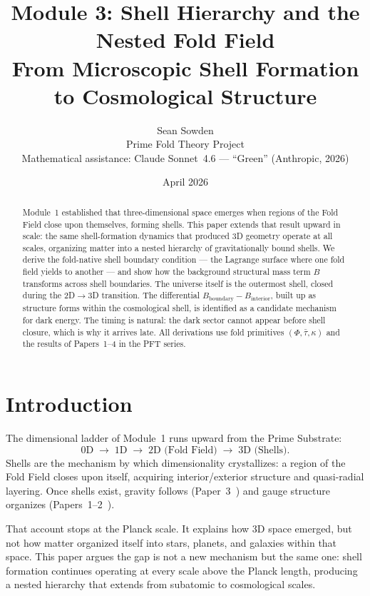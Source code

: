\documentclass[12pt]{article}
\title{\textbf{Module 3: Shell Hierarchy and the Nested Fold Field}\\[4pt]
\large From Microscopic Shell Formation to Cosmological Structure}
\author{Sean Sowden\\
\small Prime Fold Theory Project\\[4pt]
\small Mathematical assistance: Claude Sonnet~4.6 --- ``Green'' (Anthropic, 2026)}
\date{April 2026}
\newcommand{\taubar}{\bar{\tau}}
\begin{document}
\maketitle

\begin{abstract}
Module~1 established that three-dimensional space emerges when regions of the
Fold Field close upon themselves, forming shells. This paper extends that result
upward in scale: the same shell-formation dynamics that produced 3D geometry
operate at all scales, organizing matter into a nested hierarchy of gravitationally
bound shells. We derive the fold-native shell boundary condition --- the
Lagrange surface where one fold field yields to another --- and show how the
background structural mass term $B$ transforms across shell boundaries.
The universe itself is the outermost shell, closed during the 2D$\to$3D
transition. The differential $B_{\mathrm{boundary}} - B_{\mathrm{interior}}$,
built up as structure forms within the cosmological shell, is identified as a
candidate mechanism for dark energy. The timing is natural: the dark sector
cannot appear before shell closure, which is why it arrives late.
All derivations use fold primitives $(\Phi, \taubar, \kappa)$ and the
results of Papers~1--4 in the PFT series.
\end{abstract}

\section{Introduction}

The dimensional ladder of Module~1 runs upward from the Prime Substrate:
\begin{equation}
  \text{0D} \;\to\; \text{1D} \;\to\; \text{2D (Fold Field)} \;\to\;
  \text{3D (Shells)}.
\end{equation}
Shells are the mechanism by which dimensionality crystallizes: a region of
the Fold Field closes upon itself, acquiring interior/exterior structure
and quasi-radial layering. Once shells exist, gravity follows
(Paper~3~\cite{gravity}) and gauge structure organizes
(Papers~1--2~\cite{gauge,attractor}).

That account stops at the Planck scale. It explains how 3D space emerged,
but not how matter organized itself into stars, planets, and galaxies within
that space. This paper argues the gap is not a new mechanism but the same
one: shell formation continues operating at every scale above the Planck
length, producing a nested hierarchy that extends from subatomic to
cosmological scales.
\end{document}
